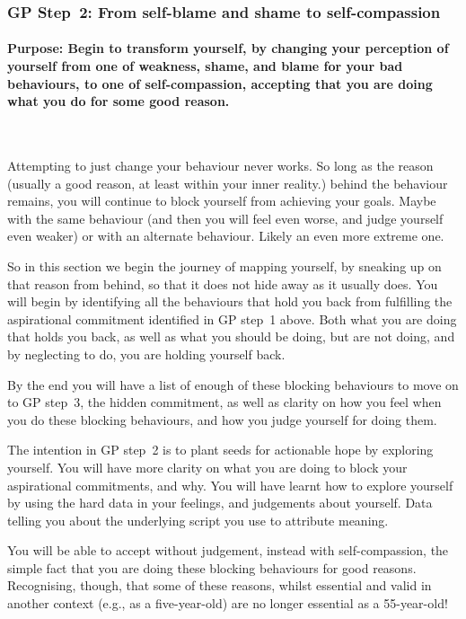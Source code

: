 \subsubsection{GP Step~2: From self-blame and shame to self-compassion}


\paragraph{Purpose: Begin to transform yourself, by changing your perception of yourself from one of weakness, shame, and blame for your bad behaviours, to one of self-compassion, accepting that you are doing what you do for some good reason.} ~


Attempting to just change your behaviour never works. So long as the reason (usually a good reason, at least within your inner reality.) behind the behaviour remains, you will continue to block yourself from achieving your goals. Maybe with the same behaviour (and then you will feel even worse, and judge yourself even weaker) or with an alternate behaviour. Likely an even more extreme one. 


So in this section we begin the journey of mapping yourself, by sneaking up on that reason from behind, so that it does not hide away as it usually does. You will begin by identifying all the behaviours that hold you back from fulfilling the aspirational commitment identified in GP step~1 above. Both what you are doing that holds you back, as well as what you should be doing, but are not doing, and by neglecting to do, you are holding yourself back. 


By the end you will have a list of enough of these blocking behaviours to move on to GP step~3, the hidden commitment, as well as clarity on how you feel when you do these blocking behaviours, and how you judge yourself for doing them.


The intention in GP step~2 is to plant seeds for actionable hope by exploring yourself. You will have more clarity on what you are doing to block your aspirational commitments, and why. You will have learnt how to explore yourself by using the hard data in your feelings, and judgements about yourself. Data telling you about the underlying script you use to attribute meaning. 


You will be able to accept without judgement, instead with self-compassion, the simple fact that you are doing these blocking behaviours for good reasons. Recognising, though, that some of these reasons, whilst essential and valid in another context (e.g., as a five-year-old) are no longer essential as a 55-year-old!


